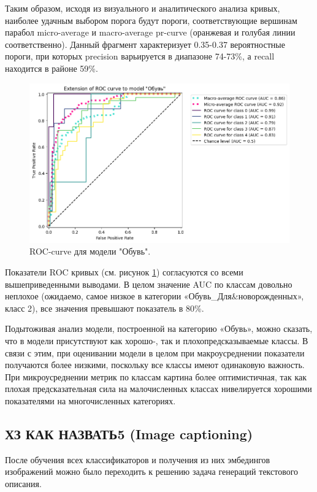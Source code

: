 \documentclass[a4paper,12pt]{extarticle}
\begin{document}
Таким образом, исходя из визуального и аналитического анализа кривых, наиболее удачным выбором порога будут пороги, соответствующие вершинам парабол micro-average и macro-average pr-curve (оранжевая и голубая линии соответственно). Данный фрагмент характеризует 0.35-0.37 вероятностные пороги, при которых precision варьируется в диапазоне 74-73\%, а recall находится в районе 59\%.

\begin{figure}[h]
	\centering
	\includegraphics[scale=0.6]{roc_curves/roccurve_Обувь.png}
	\caption{ROC-curve для модели "Обувь".}
	\label{fig:roccurve_Обувь2}
\end{figure}

Показатели ROC кривых (см. рисунок \ref{fig:roccurve_Обувь2}) согласуются со всеми вышеприведенными выводами. В целом значение AUC по классам довольно неплохое (ожидаемо, самое низкое в категории «Обувь\_Для\&новорожденных», класс 2), все значения превышают показатель в 80\%.

Подытоживая анализ модели, построенной на категорию «Обувь», можно сказать, что в модели присутствуют как хорошо-, так и плохопредсказываемые классы. В связи с этим, при оценивании модели в целом при макроусреднении показатели получаются более низкими, поскольку все классы имеют одинаковую важность. При микроусреднении метрик по классам картина более оптимистичная, так как плохая предсказательная сила на малочисленных классах нивелируется хорошими показателями на многочисленных категориях.


\subsection{ХЗ КАК НАЗВАТЬ5 (Image captioning)}

После обучения всех классификаторов и получения из них эмбедингов изображений можно было переходить к решению задача генераций текстового описания. 
\end{document}
